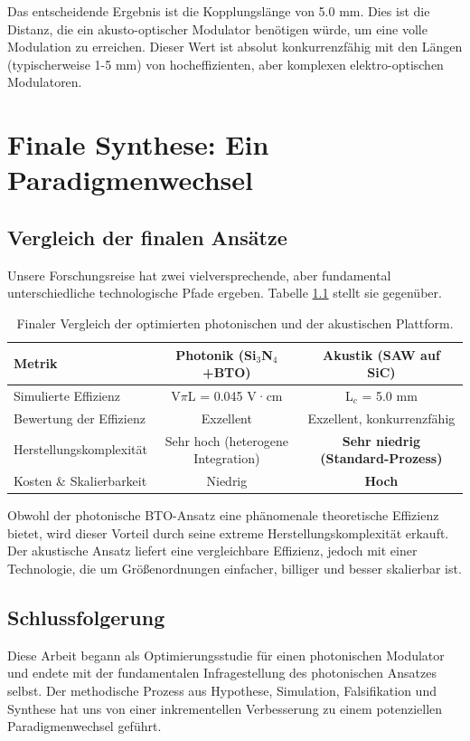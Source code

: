 \documentclass[12pt, a4paper, numbers]{report}
\begin{document}
Das entscheidende Ergebnis ist die Kopplungslänge von 5.0 mm. Dies ist die Distanz, die ein akusto-optischer Modulator benötigen würde, um eine volle Modulation zu erreichen. Dieser Wert ist absolut konkurrenzfähig mit den Längen (typischerweise 1-5 mm) von hocheffizienten, aber komplexen elektro-optischen Modulatoren.

\chapter{Finale Synthese: Ein Paradigmenwechsel}
\section{Vergleich der finalen Ansätze}
Unsere Forschungsreise hat zwei vielversprechende, aber fundamental unterschiedliche technologische Pfade ergeben. Tabelle \ref{tab:final_comp} stellt sie gegenüber.

\begin{table}[htbp]
\caption{Finaler Vergleich der optimierten photonischen und der akustischen Plattform.}
\label{tab:final_comp}
\centering
\begin{tabular}{lcc}
\toprule
\textbf{Metrik} & \textbf{Photonik (Si$_3$N$_4$+BTO)} & \textbf{Akustik (SAW auf SiC)} \\
\midrule
Simulierte Effizienz & V$\pi$L = 0.045 V·cm & L$_c$ = 5.0 mm \\
Bewertung der Effizienz & Exzellent & Exzellent, konkurrenzfähig \\
Herstellungskomplexität & Sehr hoch (heterogene Integration) & \textbf{Sehr niedrig (Standard-Prozess)} \\
Kosten \& Skalierbarkeit & Niedrig & \textbf{Hoch} \\
\bottomrule
\end{tabular}
\end{table}

Obwohl der photonische BTO-Ansatz eine phänomenale theoretische Effizienz bietet, wird dieser Vorteil durch seine extreme Herstellungskomplexität erkauft. Der akustische Ansatz liefert eine vergleichbare Effizienz, jedoch mit einer Technologie, die um Größenordnungen einfacher, billiger und besser skalierbar ist.

\section{Schlussfolgerung}
Diese Arbeit begann als Optimierungsstudie für einen photonischen Modulator und endete mit der fundamentalen Infragestellung des photonischen Ansatzes selbst. Der methodische Prozess aus Hypothese, Simulation, Falsifikation und Synthese hat uns von einer inkrementellen Verbesserung zu einem potenziellen Paradigmenwechsel geführt.
\end{document}
